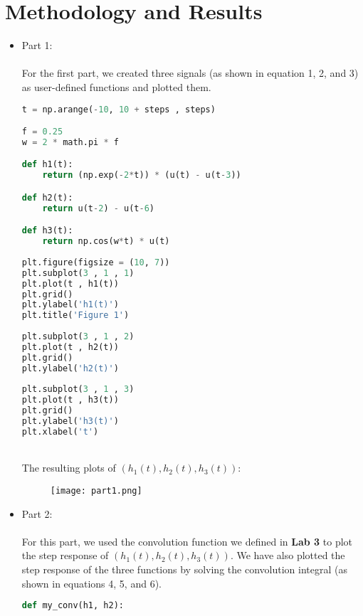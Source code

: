 \documentclass[12pt,a4paper]{article}
\begin{document}
\section{Methodology and Results}\label{sec:meth}
\begin{itemize}
    \item
    Part 1:\\
    
    \\For the first part, we created three signals (as shown in equation 1, 2, and 3) as user-defined functions and plotted them.
    
\begin{lstlisting}[language=Python, caption={User-defined functions}, label={lst:code}, mathescape=true, breaklines=true]
t = np.arange(-10, 10 + steps , steps)

f = 0.25
w = 2 * math.pi * f

def h1(t):
    return (np.exp(-2*t)) * (u(t) - u(t-3))

def h2(t):
    return u(t-2) - u(t-6)

def h3(t):
    return np.cos(w*t) * u(t)
    
plt.figure(figsize = (10, 7))
plt.subplot(3 , 1 , 1)
plt.plot(t , h1(t))
plt.grid()
plt.ylabel('h1(t)')
plt.title('Figure 1')
 
plt.subplot(3 , 1 , 2)
plt.plot(t , h2(t))
plt.grid()
plt.ylabel('h2(t)')
 
plt.subplot(3 , 1 , 3)
plt.plot(t , h3(t))
plt.grid()
plt.ylabel('h3(t)')
plt.xlabel('t')
\end{lstlisting}

    \\The resulting plots of $(h_1(t), h_2(t), h_3(t))$:
\begin{figure}[h]
    \centering
    \texttt{[image: part1.png]}
\end{figure}

    \item
    Part 2:\\
    
    \\For this part, we used the convolution function we defined in \textbf{Lab 3} to plot the step response of $(h_1(t), h_2(t), h_3(t))$. We have also plotted the step response of the three functions by solving the convolution integral (as shown in equations 4, 5, and 6).

\begin{lstlisting}[language=Python, caption={Step response using user-defined function}, label={lst:code}, mathescape=true, breaklines=true]
def my_conv(h1, h2):
    

\end{lstlisting}
\end{itemize}
\end{document}

